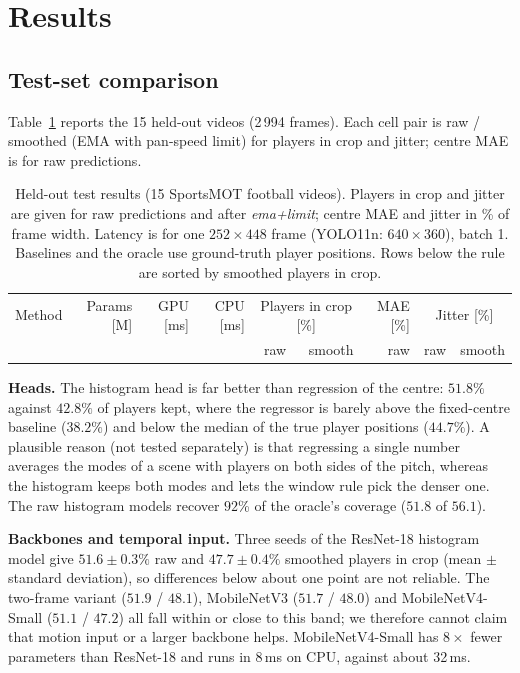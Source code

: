 \documentclass[conference]{IEEEtran}
\begin{document}
\section{Results}
\subsection{Test-set comparison}
Table~\ref{tab:main} reports the 15 held-out videos (2\,994 frames). Each cell pair is raw / smoothed (EMA with pan-speed limit) for players in crop and jitter; centre MAE is for raw predictions.

\begin{table}[t]
\centering
\caption{Held-out test results (15 SportsMOT football videos). Players in crop and jitter are given for raw predictions and after \emph{ema+limit}; centre MAE and jitter in \% of frame width. Latency is for one $252{\times}448$ frame (YOLO11n: $640{\times}360$), batch 1. Baselines and the oracle use ground-truth player positions. Rows below the rule are sorted by smoothed players in crop.}
\label{tab:main}
\begin{tabular}{lrrrrrrrr}
\toprule
Method & Params [M] & GPU [ms] & CPU [ms] & \multicolumn{2}{c}{Players in crop [\%]} & MAE [\%] & \multicolumn{2}{c}{Jitter [\%]}\\
 & & & & raw & smooth & raw & raw & smooth \\
\midrule

\end{tabular}
\end{table}

\textbf{Heads.} The histogram head is far better than regression of the centre: $51.8\%$ against $42.8\%$ of players kept, where the regressor is barely above the fixed-centre baseline ($38.2\%$) and below the median of the true player positions ($44.7\%$). A plausible reason (not tested separately) is that regressing a single number averages the modes of a scene with players on both sides of the pitch, whereas the histogram keeps both modes and lets the window rule pick the denser one. The raw histogram models recover $92$\% of the oracle's coverage ($51.8$ of $56.1$).

\textbf{Backbones and temporal input.} Three seeds of the ResNet-18 histogram model give $51.6\pm0.3\%$ raw and $47.7\pm0.4\%$ smoothed players in crop (mean $\pm$ standard deviation), so differences below about one point are not reliable. The two-frame variant ($51.9$ / $48.1$), MobileNetV3 ($51.7$ / $48.0$) and MobileNetV4-Small ($51.1$ / $47.2$) all fall within or close to this band; we therefore cannot claim that motion input or a larger backbone helps. MobileNetV4-Small has $8\times$ fewer parameters than ResNet-18 and runs in 8\,ms on CPU, against about 32\,ms.
\end{document}
